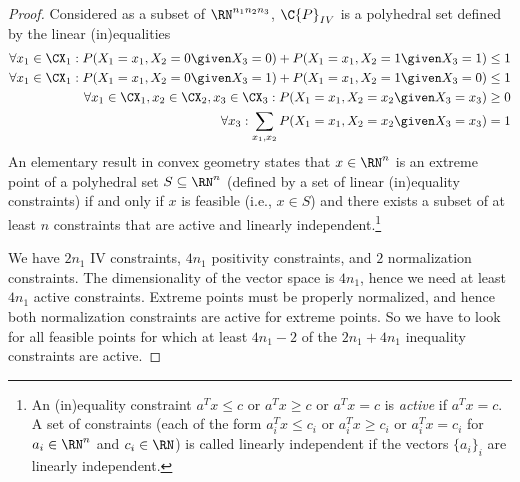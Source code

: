 \begin{proof}
  Considered as a subset of $\RN^{n_1 n_2 n_3}$, $\C{P}_{IV}$ is a polyhedral set defined by the linear (in)equalities
  \begin{align*}
    \forall x_1\in\CX_1: P(X_1=x_1,X_2=0 \given X_3=0) + P(X_1=x_1,X_2=1 \given X_3=1) &\le 1 \\
    \forall x_1\in\CX_1: P(X_1=x_1,X_2=0 \given X_3=1) + P(X_1=x_1,X_2=1 \given X_3=0) &\le 1 \\
    \forall x_1\in\CX_1,x_2\in\CX_2,x_3\in\CX_3: P(X_1=x_1,X_2=x_2 \given X_3=x_3) &\ge 0 \\
    \forall x_3: \sum_{x_1,x_2} P(X_1=x_1,X_2=x_2 \given X_3=x_3) &= 1
  \end{align*}
  An elementary result in convex geometry states that $x \in \RN^n$ is an extreme point of a polyhedral set $S \subseteq \RN^n$ (defined by a set of linear (in)equality constraints) if and only if $x$ is feasible (i.e., $x \in S$) and there exists a subset of at least $n$ constraints that are active and linearly independent.\footnote{An (in)equality constraint $a^T x \le c$ or $a^T x \ge c$ or $a^T x = c$ is \emph{active} if $a^T x = c$. A set of constraints (each of the form $a_i^T x \le c_i$ or $a_i^T x \ge c_i$ or $a_i^T x = c_i$ for $a_i \in \RN^n$ and $c_i \in \RN$) is called linearly independent if the vectors $\{a_i\}_i$ are linearly independent.}

  We have $2n_1$ IV constraints, $4n_1$ positivity constraints, and $2$ normalization constraints.
  The dimensionality of the vector space is $4n_1$, hence we need at least $4n_1$ active constraints.
  Extreme points must be properly normalized, and hence both normalization constraints are active for extreme points.
  So we have to look for all feasible points for which at least $4n_1 - 2$ of the $2n_1 + 4n_1$ inequality constraints are active.


\end{proof}
